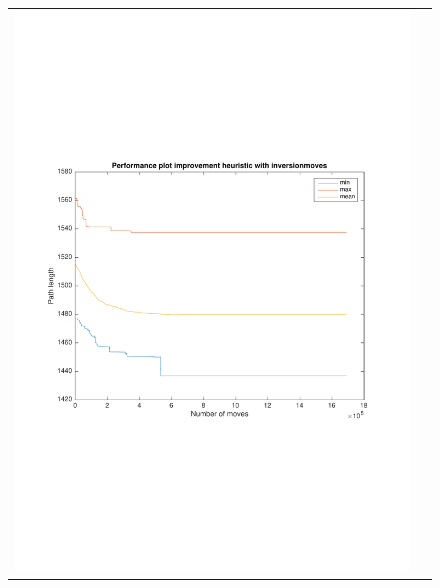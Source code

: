 \documentclass[a4paper, 11pt]{scrartcl}
\begin{document}
\begin{figure}[!ht]
\begin{tabular}{cc}
    \includegraphics[scale=0.4, trim={3cm 6cm 1cm 6cm}]{../figures/perfPlot_inversion.pdf} & 

\end{tabular}
\end{figure}
\end{document}
